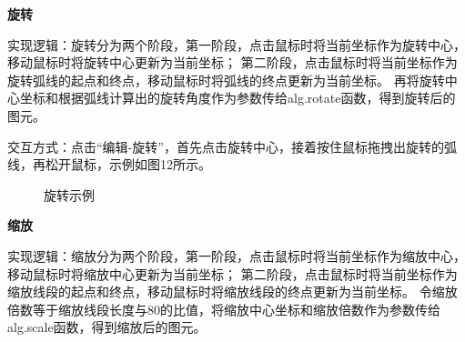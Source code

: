 \documentclass[a4paper,UTF8]{article}
\theoremstyle{definition}
\begin{document}
\textbf{旋转}

实现逻辑：旋转分为两个阶段，第一阶段，点击鼠标时将当前坐标作为旋转中心，移动鼠标时将旋转中心更新为当前坐标；
第二阶段，点击鼠标时将当前坐标作为旋转弧线的起点和终点，移动鼠标时将弧线的终点更新为当前坐标。
再将旋转中心坐标和根据弧线计算出的旋转角度作为参数传给alg.rotate函数，得到旋转后的图元。

交互方式：点击“编辑-旋转”，首先点击旋转中心，接着按住鼠标拖拽出旋转的弧线，再松开鼠标，示例如图12所示。
\begin{figure}[H]
    \centering
        \caption{旋转示例}
        \label{fig:1}
\end{figure}

\textbf{缩放}

实现逻辑：缩放分为两个阶段，第一阶段，点击鼠标时将当前坐标作为缩放中心，移动鼠标时将缩放中心更新为当前坐标；
第二阶段，点击鼠标时将当前坐标作为缩放线段的起点和终点，移动鼠标时将缩放线段的终点更新为当前坐标。
令缩放倍数等于缩放线段长度与80的比值，将缩放中心坐标和缩放倍数作为参数传给alg.scale函数，得到缩放后的图元。
\end{document}
